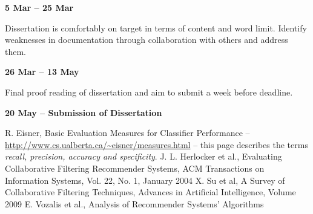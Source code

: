 \textbf{5 Mar -- 25 Mar}

Dissertation is comfortably on target in terms of content and word limit.
Identify weaknesses in documentation through collaboration with others and 
address them.

\textbf{26 Mar -- 13 May}

Final proof reading of dissertation and aim to submit a week before deadline.

\textbf{20 May -- Submission of Dissertation}


\begin{thebibliography}{}
  R. Eisner, Basic Evaluation Measures for Classifier Performance -- \url{http://www.cs.ualberta.ca/~eisner/measures.html} -- this page describes the terms \textit{recall, precision, accuracy and specificity}.
  J. L. Herlocker et al., Evaluating Collaborative Filtering Recommender Systems, ACM Transactions on Information Systems, Vol. 22, No. 1, January 2004
  X. Su et al, A Survey of Collaborative Filtering Techniques, Advances in Artificial Intelligence, Volume 2009
  E. Vozalis et al., Analysis of Recommender Systems' Algorithms
\end{thebibliography}
